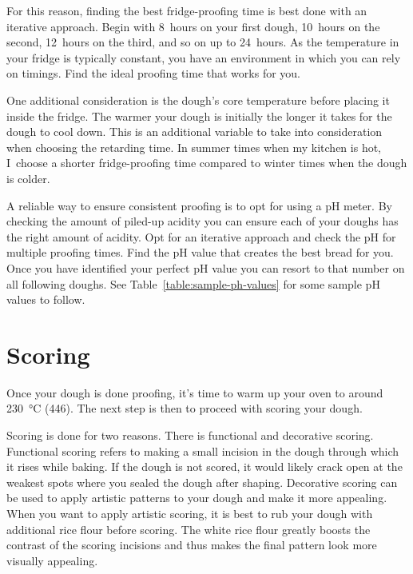 For this reason, finding the best fridge-proofing time is best done
with an iterative approach. Begin with 8~hours on your first dough,
10~hours on the second, 12~hours on the third, and so on up to 24~hours.
As the temperature in your fridge is typically constant, you have an
environment in which you can rely on timings. Find the ideal proofing
time that works for you.

One additional consideration is the dough's core temperature before
placing it inside the fridge. The warmer your dough is initially
the longer it takes for the dough to cool down. This is an additional
variable to take into consideration when choosing the retarding time.
In summer times when my kitchen is hot, I~choose a shorter fridge-proofing
time compared to winter times when the dough is colder.

A reliable way to ensure consistent proofing is to opt for using a pH
meter. By checking the amount of piled-up acidity you can ensure
each of your doughs has the right amount of acidity. Opt for an iterative
approach and check the pH for multiple proofing times. Find the pH
value that creates the best bread for you. Once you have identified
your perfect pH value you can resort to that number on all following
doughs. See Table~\ref{table:sample-ph-values} for some sample pH values
to follow.

\section{Scoring}

Once your dough is done proofing, it's time to warm up your oven
to around \qty{230}{\degreeCelsius} (\qty{446}{\degF}). The next step is then
to proceed with scoring your dough.

Scoring is done for two reasons. There is functional and decorative
scoring. Functional scoring refers to making a small incision in the dough
through which it rises while baking. If the dough is not scored,
it would likely crack open at the weakest spots where you sealed
the dough after shaping. Decorative scoring can be used to apply
artistic patterns to your dough and make it more appealing. When
you want to apply artistic scoring, it is best to rub your dough
with additional rice flour before scoring. The white rice flour
greatly boosts the contrast of the scoring incisions and thus
makes the final pattern look more visually appealing.

